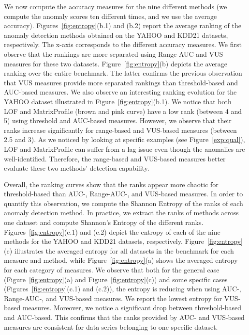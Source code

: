 We now compute the accuracy measures for the nine different methods (we compute the anomaly scores ten different times, and we use the average accuracy). 
Figures~\ref{fig:entropy}(b.1) and (b.2) report the average ranking of the anomaly detection methods obtained on the YAHOO and KDD21 datasets, respectively. 
The x-axis corresponds to the different accuracy measures. We first observe that the rankings are more separated using Range-AUC and VUS measures for these two datasets. Figure~\ref{fig:entropy}(b) depicts the average ranking over the entire benchmark. The latter confirms the previous observation that VUS measures provide more separated rankings than threshold-based and AUC-based measures. We also observe an interesting ranking evolution for the YAHOO dataset illustrated in Figure~\ref{fig:entropy}(b.1). We notice that both LOF and MatrixProfile (brown and pink curve) have a low rank (between 4 and 5) using threshold and AUC-based measures. However, we observe that their ranks increase significantly for range-based and VUS-based measures (between 2.5 and 3). As we noticed by looking at specific examples (see Figure~\ref{exp:qual}), LOF and MatrixProfile can suffer from a lag issue even though the anomalies are well-identified. Therefore, the range-based and VUS-based measures better evaluate these two methods' detection capability.


Overall, the ranking curves show that the ranks appear more chaotic for threshold-based than AUC-, Range-AUC-, and VUS-based measures. 
In order to quantify this observation, we compute the Shannon Entropy of the ranks of each anomaly detection method. 
In practice, we extract the ranks of methods across one dataset and compute Shannon's Entropy of the different ranks. 
Figures~\ref{fig:entropy}(c.1) and (c.2) depict the entropy of each of the nine methods for the YAHOO and KDD21 datasets, respectively. 
Figure~\ref{fig:entropy}(c) illustrates the averaged entropy for all datasets in the benchmark for each measure and method, while Figure~\ref{fig:entropy}(a) shows the averaged entropy for each category of measures.
We observe that both for the general case (Figure~\ref{fig:entropy}(a) and Figure~\ref{fig:entropy}(c)) and some specific cases (Figures~\ref{fig:entropy}(c.1) and (c.2)), the entropy is reducing when using AUC-, Range-AUC-, and VUS-based measures. 
We report the lowest entropy for VUS-based measures. 
Moreover, we notice a significant drop between threshold-based and AUC-based. 
This confirms that the ranks provided by AUC- and VUS-based measures are consistent for data series belonging to one specific dataset. 


